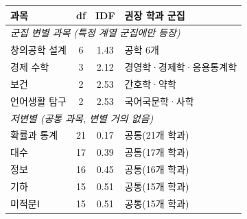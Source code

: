 \begin{tabular}{lccl}
\hline
과목 & df & IDF & 권장 학과 군집 \\
\hline
\multicolumn{4}{l}{\textit{군집 변별 과목 (특정 계열 군집에만 등장)}} \\
창의공학 설계 & 6 & 1.43 & 공학 6개 \\
경제 수학 & 3 & 2.12 & 경영학·경제학·응용통계학 \\
보건 & 2 & 2.53 & 간호학·약학 \\
언어생활 탐구 & 2 & 2.53 & 국어국문학·사학 \\
\hline
\multicolumn{4}{l}{\textit{저변별 (공통 과목, 변별 거의 없음)}} \\
확률과 통계 & 21 & 0.17 & 공통(21개 학과) \\
대수 & 17 & 0.39 & 공통(17개 학과) \\
정보 & 16 & 0.45 & 공통(16개 학과) \\
기하 & 15 & 0.51 & 공통(15개 학과) \\
미적분Ⅰ & 15 & 0.51 & 공통(15개 학과) \\
\hline
\end{tabular}
